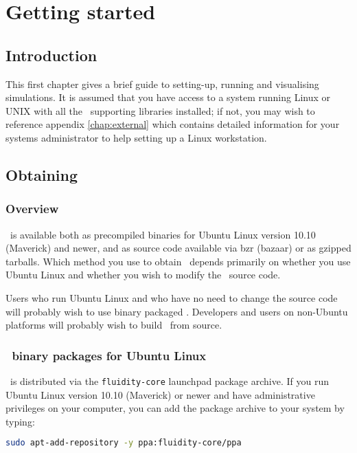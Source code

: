 \chapter{Getting started}\label{chap:gettingstarted}

\section{Introduction} This first chapter gives a brief guide to setting-up,
running and visualising simulations. It is assumed that you have access to a
system running Linux or UNIX with all the \fluidity\ supporting libraries
installed; if not, you may wish to reference appendix \ref{chap:external} which
contains detailed information for your systems administrator to help setting up
a Linux workstation. 

\section{Obtaining \fluidity}
\label{sec:obtaining_fluidity}

\subsection{Overview}
\label{sec:obtaining_fluidity_overview}

\fluidity\ is available both as precompiled binaries for Ubuntu Linux version
10.10 (Maverick) and newer, and as source code available via bzr (bazaar) or as
gzipped tarballs. Which method you use to obtain \fluidity\ depends primarily on
whether you use Ubuntu Linux and whether you wish to modify the \fluidity\
source code.

Users who run Ubuntu Linux and who have no need to change the source code will
probably wish to use binary packaged \fluidity. Developers and users on
non-Ubuntu platforms will probably wish to build \fluidity\ from source.

\subsection{\fluidity\ binary packages for Ubuntu Linux}

\fluidity\ is distributed via the \lstinline[language=Bash]+fluidity-core+
launchpad package archive. If you run Ubuntu Linux version 10.10 (Maverick) or
newer and have administrative privileges on your computer, you can add the
package archive to your system by typing:

\begin{lstlisting}[language=Bash]
sudo apt-add-repository -y ppa:fluidity-core/ppa
\end{lstlisting}

